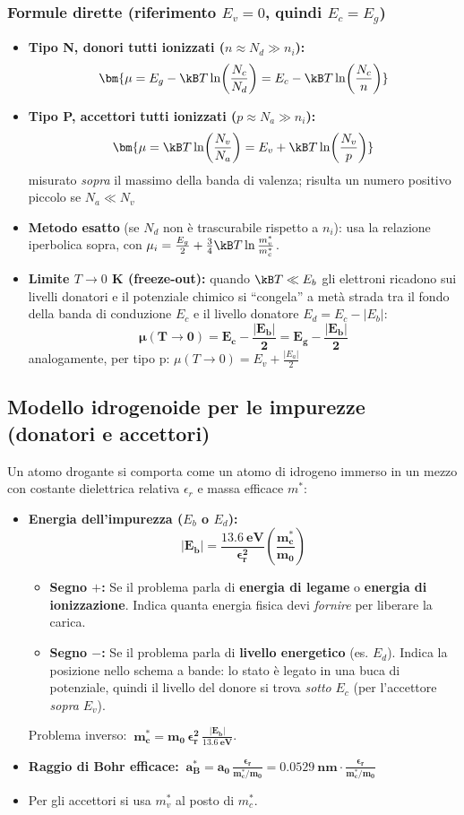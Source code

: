 \subsubsection*{Formule dirette (riferimento $E_v=0$, quindi $E_c=E_g$)}
\begin{itemize}
    \item \textbf{Tipo N, donori tutti ionizzati ($n\approx N_d\gg n_i$):}
    \[ \bm{\mu = E_g - \kB T\ln\!\left(\frac{N_c}{N_d}\right) = E_c - \kB T\ln\!\left(\frac{N_c}{n}\right)} \]
    \item \textbf{Tipo P, accettori tutti ionizzati ($p\approx N_a\gg n_i$):}
    \[ \bm{\mu = \kB T\ln\!\left(\frac{N_v}{N_a}\right) = E_v + \kB T\ln\!\left(\frac{N_v}{p}\right)} \]
    misurato \emph{sopra} il massimo della banda di valenza; risulta un numero positivo piccolo se $N_a\ll N_v$
    \item \textbf{Metodo esatto} (se $N_d$ non è trascurabile rispetto a $n_i$): usa la relazione iperbolica sopra, con
    $\mu_i = \frac{E_g}{2}+\frac34\kB T\ln\frac{m_v^*}{m_c^*}$.
    \item \textbf{Limite $T\to0$ K (freeze-out):} quando $\kB T\ll E_b$ gli elettroni ricadono sui livelli donatori e il potenziale chimico si ``congela'' a metà strada tra il fondo della banda di conduzione $E_c$ e il livello donatore $E_d=E_c-|E_b|$:
    \[ \bm{\mu(T\to0) = E_c - \frac{|E_b|}{2} = E_g - \frac{|E_b|}{2}} \]
    analogamente, per tipo p: $\mu(T\to0) = E_v + \frac{|E_a|}{2}$
\end{itemize}

\subsection{Modello idrogenoide per le impurezze (donatori e accettori)}
Un atomo drogante si comporta come un atomo di idrogeno immerso in un mezzo con costante dielettrica relativa $\epsilon_r$ e massa efficace $m^*$:
\begin{itemize}
    \item \textbf{Energia dell'impurezza ($E_b$ o $E_d$):} 
    \[\bm{|E_b| = \frac{13.6\ \text{eV}}{\epsilon_r^2}\left(\frac{m_c^*}{m_0}\right)}\]
    \begin{itemize}
        \item \textbf{Segno $+$:} Se il problema parla di \textbf{energia di legame} o \textbf{energia di ionizzazione}. Indica quanta energia fisica devi \emph{fornire} per liberare la carica.
        \item \textbf{Segno $-$:} Se il problema parla di \textbf{livello energetico} (es. $E_d$). Indica la posizione nello schema a bande: lo stato è legato in una buca di potenziale, quindi il livello del donore si trova \emph{sotto} $E_c$ (per l'accettore \emph{sopra} $E_v$).
    \end{itemize}
    Problema inverso: $\ \bm{m_c^* = m_0\,\epsilon_r^2\,\frac{|E_b|}{13.6\ \text{eV}}}$.
    \item \textbf{Raggio di Bohr efficace:} $\ \bm{a_B^* = a_0\,\frac{\epsilon_r}{m_c^*/m_0} = 0.0529\ \text{nm}\cdot\frac{\epsilon_r}{m_c^*/m_0}}$
    \item Per gli accettori si usa $m_v^*$ al posto di $m_c^*$.
\end{itemize}


